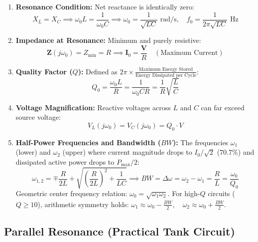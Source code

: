 \documentclass[12pt,a4paper]{article}
\begin{document}
\begin{tcolorbox}[formulabox, title={\textbf{Series Resonance Equations}}]
\begin{enumerate}[leftmargin=*]
  \item \textbf{Resonance Condition:} Net reactance is identically zero:
  \begin{equation}
    X_L = X_C \implies \omega_0 L = \frac{1}{\omega_0 C} \implies \omega_0 = \frac{1}{\sqrt{LC}} \text{ rad/s}, \quad f_0 = \frac{1}{2\pi\sqrt{LC}} \text{ Hz}
  \end{equation}
  \item \textbf{Impedance at Resonance:} Minimum and purely resistive:
  \begin{equation}
    \mathbf{Z}(j\omega_0) = Z_{\min} = R \implies \mathbf{I}_0 = \frac{\mathbf{V}}{R} \quad (\text{Maximum Current})
  \end{equation}
  \item \textbf{Quality Factor ($Q$):} Defined as $2\pi \times \frac{\text{Maximum Energy Stored}}{\text{Energy Dissipated per Cycle}}$:
  \begin{equation}
    Q_0 = \frac{\omega_0 L}{R} = \frac{1}{\omega_0 C R} = \frac{1}{R}\sqrt{\frac{L}{C}}
  \end{equation}
  \item \textbf{Voltage Magnification:} Reactive voltages across $L$ and $C$ can far exceed source voltage:
  \begin{equation}
    V_L(j\omega_0) = V_C(j\omega_0) = Q_0 \cdot V
  \end{equation}
  \item \textbf{Half-Power Frequencies and Bandwidth ($BW$):}
  The frequencies $\omega_1$ (lower) and $\omega_2$ (upper) where current magnitude drops to $I_0/\sqrt{2}$ ($70.7\%$) and dissipated active power drops to $P_{\max}/2$:
  \begin{equation}
    \omega_{1,2} = \mp \frac{R}{2L} + \sqrt{\left(\frac{R}{2L}\right)^2 + \frac{1}{LC}} \implies BW = \Delta\omega = \omega_2 - \omega_1 = \frac{R}{L} = \frac{\omega_0}{Q_0}
  \end{equation}
  Geometric center frequency relation: $\omega_0 = \sqrt{\omega_1 \omega_2}$. For high-$Q$ circuits ($Q \ge 10$), arithmetic symmetry holds: $\omega_1 \approx \omega_0 - \frac{BW}{2}, \quad \omega_2 \approx \omega_0 + \frac{BW}{2}$.
\end{enumerate}
\end{tcolorbox}

\subsection{Parallel Resonance (Practical Tank Circuit)}
\end{document}
